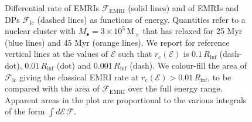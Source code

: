 \documentclass[desactivate]{aa}
\begin{document}
        \begin{figure}
        \centering
        \caption{Differential rate of EMRIs $\mathcal{F}_\mathrm{EMRI}$ (solid lines) and of EMRIs and DPs $\mathcal{F}_\mathrm{lc}$ (dashed lines) as functions of energy. Quantities refer to a nuclear cluster with $M_\bullet = 3\times10^5\, \mathrm{M_\sun}$ that has relaxed for 25 Myr (blue lines) and 45 Myr (orange lines). We report for reference vertical lines at the values of $\mathcal{E}$ such that $r_\mathrm{c}(\mathcal{E})$ is $0.1\,R_\mathrm{inf}$ (dash-dot), $0.01\, R_\mathrm{inf}$ (dot) and $0.001\,R_\mathrm{inf}$ (dash). We colour-fill the area of $\mathcal{F}_\mathrm{lc}$ giving the classical EMRI rate at $r_\mathrm{c}(\mathcal{E}) > 0.01\,R_\mathrm{inf}$, to be compared with the area of $\mathcal{F}_\mathrm{EMRI}$ over the full energy range. Apparent areas in the plot are proportional to the various integrals of the form $\int d\mathcal{E} \,\mathcal{F}$.}
        \label{fig:rates}
    \end{figure}
\end{document}
